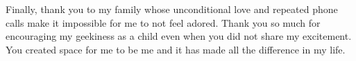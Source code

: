 Finally, thank you to my family whose unconditional love and repeated
phone calls make it impossible for me to not feel adored. Thank you so
much for encouraging my geekiness as a child even when you did not share my excitement. You created space for me to be me and it has made all
the difference in my life.
